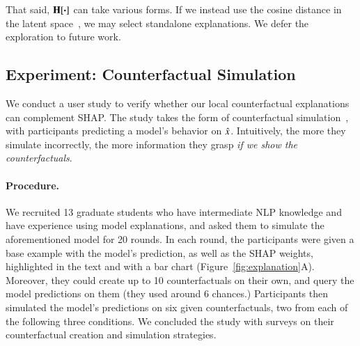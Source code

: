 That said, $\operatorname*{\mathbf{H}}[\boldsymbol{\cdot}]$ can take various forms.
If we instead use the cosine distance in the latent space~\cite{reimers-2019-sentence-bert}, we may select standalone explanations.
We defer the exploration to future work.


\subsection{Experiment: Counterfactual Simulation}
\label{subsec:exp_user_study}

We conduct a user study to verify whether our local counterfactual explanations can complement SHAP.
The study takes the form of counterfactual simulation~\cite{hase2020evaluating}, with participants predicting a model's behavior on $\hat{x}$.
Intuitively, the more they simulate incorrectly, the more information they grasp \emph{if we show the counterfactuals}.

\paragraph{Procedure.}
We recruited 13 graduate students who have intermediate NLP knowledge and have experience using model explanations, and asked them to simulate the aforementioned \qqp model for 20 rounds.
In each round, the participants were given a base example with the model's prediction, as well as the SHAP weights, highlighted in the text and with a bar chart (Figure~\ref{fig:explanation}A).
Moreover, they could create up to 10 counterfactuals on their own, and query the model predictions on them (they used around 6 chances.)
Participants then simulated the model's predictions on six given counterfactuals, two from each of the following three conditions.
We concluded the study with surveys on their counterfactual creation and simulation strategies.



